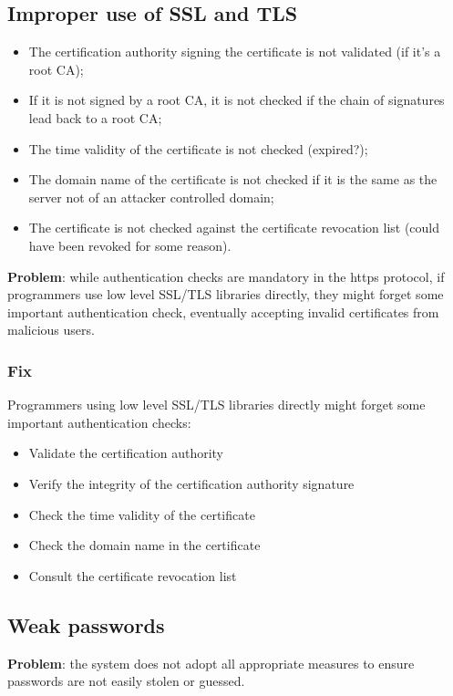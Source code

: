 \documentclass[a4paper, 10pt, titlepage]{article}
\begin{document}
\subsection{Improper use of SSL and TLS}
\begin{itemize}
\item The certification authority signing the certificate is not validated (if it’s a root CA);
\item If it is not signed by a root CA, it is not checked if the chain of signatures lead back to a root CA;
\item The time validity of the certificate is not checked (expired?);
\item The domain name of the certificate is not checked if it is the same as the server not of an attacker controlled domain;
\item The certificate is not checked against the certificate revocation list (could have been revoked for some reason).
\end{itemize} \medskip
\textbf{Problem}: while authentication checks are mandatory in the https protocol, if programmers use low level SSL/TLS libraries directly, they might forget some important authentication check, eventually accepting invalid certificates from malicious users.
\subsubsection*{Fix}
Programmers using low level SSL/TLS libraries directly might forget some important authentication checks:
\begin{itemize}
\item Validate the certification authority
\item Verify the integrity of the certification authority
signature
\item Check the time validity of the certificate
\item Check the domain name in the certificate
\item Consult the certificate revocation list
\end{itemize}

\subsection{Weak passwords}
\textbf{Problem}: the system does not adopt all appropriate measures to ensure passwords are not easily stolen or guessed.
\end{document}
